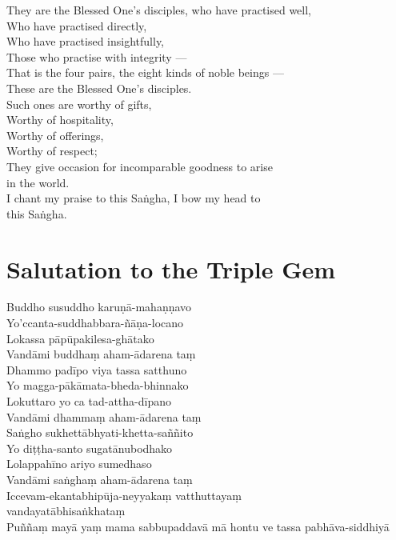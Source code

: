 They are the Blessed One's disciples, who have practised well,\\
Who have practised directly,\\
Who have practised insightfully,\\
Those who practise with integrity ---\\
That is the four pairs, the eight kinds of noble beings ---\\
These are the Blessed One's disciples.\\
Such ones are worthy of gifts,\\
Worthy of hospitality,\\
Worthy of offerings,\\
Worthy of respect;\\
They give occasion for incomparable goodness to arise \\in the world.\\
I chant my praise to this Saṅgha, I bow my head to\\ this Saṅgha.

\clearpage

\section*{Salutation to the Triple Gem}

\begin{leader}
\end{leader}


Buddho susuddho karuṇā-mahaṇṇavo\\
Yo'ccanta-suddhabbara-ñāṇa-locano\\
Lokassa pāpūpakilesa-ghātako\\
Vandāmi buddhaṃ aham-ādarena taṃ\\
Dhammo padīpo viya tassa satthuno\\
Yo magga-pākāmata-bheda-bhinnako\\
Lokuttaro yo ca tad-attha-dīpano\\
Vandāmi dhammaṃ aham-ādarena taṃ\\
Saṅgho sukhettābhyati-khetta-saññito\\
Yo diṭṭha-santo sugatānubodhako\\
Lolappahīno ariyo sumedhaso\\
Vandāmi saṅghaṃ aham-ādarena taṃ\\
Iccevam-ekantabhipūja-neyyakaṃ vatthuttayaṃ \\vandayatābhisaṅkhataṃ\\
Puññaṃ mayā yaṃ mama sabbupaddavā mā hontu ve tassa pabhāva-siddhiyā

